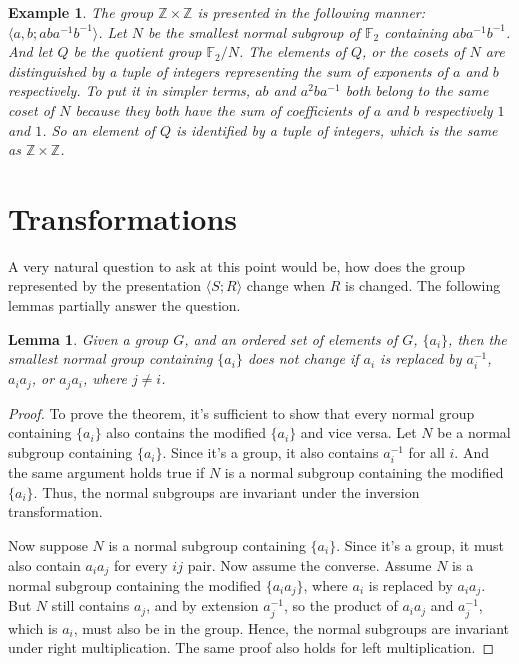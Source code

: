 \documentclass[12pt, titlepage]{article}
\newtheorem{lem}[thm]{Lemma}
\newtheorem{exmp}[thm]{Example}
\theoremstyle{definition}
\begin{document}
\begin{exmp}
The group $\mathbb{Z} \times \mathbb{Z}$ is presented in the following manner: $\langle a,b;aba^{-1}b^{-1}\rangle$. Let $N$ be the smallest normal subgroup of $\mathbb{F}_2$ containing $aba^{-1}b^{-1}$. And let $Q$ be the quotient group $\mathbb{F}_2/N$. The elements of $Q$, or the cosets of $N$ are distinguished by a tuple of integers representing the sum of exponents of $a$ and $b$ respectively. To put it in simpler terms, $ab$ and $a^2ba^{-1}$ both belong to the same coset of $N$ because they both have the sum of coefficients of $a$ and $b$ respectively $1$ and $1$. So an element of $Q$ is identified by a tuple of integers, which is the same as $\mathbb{Z} \times \mathbb{Z}$.
\end{exmp}

\section{Transformations}

A very natural question to ask at this point would be, how does the group represented by the presentation $\langle S;R \rangle$ change when $R$ is changed. The following lemmas partially answer the question. 

\begin{lem}\label{elementary}
Given a group $G$, and an ordered set of elements of $G$, $\{a_i\}$, then the smallest normal group containing $\{a_i\}$ does not change if $a_i$ is replaced by $a_i^{-1}$, $a_i a_j$, or $a_j a_i$, where $j \neq i$.
\end{lem}

\begin{proof}
To prove the theorem, it's sufficient to show that every normal group containing $\{a_i\}$ also contains the modified $\{a_i\}$ and vice versa. Let $N$ be a normal subgroup containing $\{a_i\}$. Since it's a group, it also contains $a_i^{-1}$ for all $i$. And the same argument holds true if $N$ is a normal subgroup containing the modified $\{a_i\}$. Thus, the normal subgroups are invariant under the inversion transformation.

Now suppose $N$ is a normal subgroup containing $\{a_i\}$. Since it's a group, it must also contain $a_ia_j$ for every $ij$ pair. Now assume the converse. Assume $N$ is a normal subgroup containing the modified $\{a_ia_j\}$, where $a_i$ is replaced by $a_ia_j$. But $N$ still contains $a_j$, and by extension $a_j^{-1}$, so the product of $a_ia_j$ and $a_j^{-1}$, which is $a_i$, must also be in the group. Hence, the normal subgroups are invariant under right multiplication. The same proof also holds for left multiplication.
\end{proof}
\end{document}
